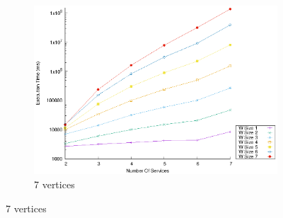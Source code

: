 \begin{figure}[!htb]
\begin{subfigure}{0.48\textwidth}
    \includegraphics[width=\textwidth]{Images/graphs/window_time_performance_qualitative_n7_s7_50_80_n7}
    \caption{7 vertices}
    \label{fig:time_window_perce_wide_7n}
  \end{subfigure}
  \label{fig:time_window_perce_average}
\end{figure}
